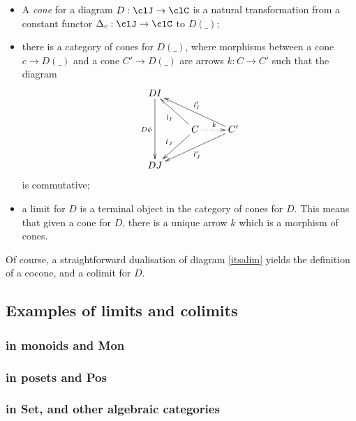 \documentclass[11pt]{article}
\begin{document}
\begin{itemize}
	\item A \emph{cone} for a diagram $D : \clJ \to \clC$ is a natural transformation from a constant functor $\Delta_c : \clJ \to \clC$ to $D(\_)$;
	\item there is a category of cones for $D(\_)$, where morphisms between a cone $c\to D(\_)$ and a cone $C'\to D(\_)$ are arrows $k : C\to C'$ such that the diagram
	      \[
		      \vcenter{\xymatrix{
				      DI \ar[dd]_{D\phi}&& \\
				      &C\ar@{.>}[r]^k \ar[ul]^{l_I}\ar[dl]_{l_J}& C' \ar[ull]_{l_I'}\ar[dll]^{l_J'}\\
				      DJ
			      }}
	      \]
	      is commutative;
	\item a limit for $D$ is a terminal object in the category of cones for $D$. This means that given a cone for $D$, there is a unique arrow $k$ which is a morphism of cones.
\end{itemize}
Of course, a straightforward dualisation of diagram \eqref{itsalim} yields the definition of a cocone, and a colimit for $D$.

\subsection{Examples of limits and colimits}

\subsubsection{in monoids and Mon}

\subsubsection{in posets and Pos}

\subsubsection{in Set, and other algebraic categories}
\end{document}
